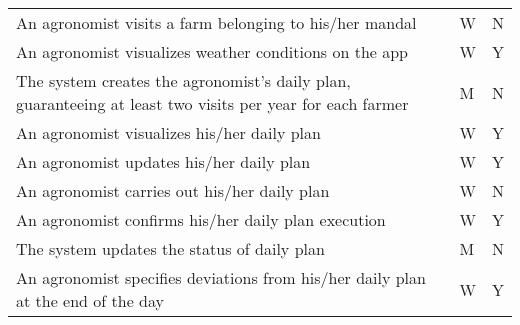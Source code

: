 \begin{center}
\begin{longtable}{ |m{7cm}|C{2.3cm}|C{1.6cm}|}
An agronomist visits a farm belonging to his/her mandal & W & N\\
An agronomist visualizes weather conditions on the app & W & Y\\
The system creates the agronomist's daily plan, guaranteeing at least two visits per year for each farmer & M & N\\
An agronomist visualizes his/her daily plan & W & Y\\
An agronomist updates his/her daily plan & W & Y\\
An agronomist carries out his/her daily plan & W & N\\
An agronomist confirms his/her daily plan execution & W & Y\\
The system updates the status of daily plan & M & N\\
An agronomist specifies deviations from his/her daily plan at the end of the day & W & Y\\

\end{longtable}

\end{center}